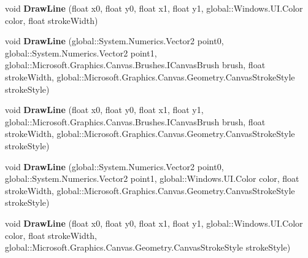 \begin{DoxyCompactItemize}
\item 
\mbox{\label{class_microsoft_1_1_graphics_1_1_canvas_1_1_canvas_drawing_session_aa5854dcca2a2abe77a62c9dc1191af23}} 
void {\bfseries Draw\+Line} (float x0, float y0, float x1, float y1, global\+::\+Windows.\+U\+I.\+Color color, float stroke\+Width)
\item 
\mbox{\label{class_microsoft_1_1_graphics_1_1_canvas_1_1_canvas_drawing_session_a5b2e900372135826791a9feb8c13550c}} 
void {\bfseries Draw\+Line} (global\+::\+System.\+Numerics.\+Vector2 point0, global\+::\+System.\+Numerics.\+Vector2 point1, global\+::\+Microsoft.\+Graphics.\+Canvas.\+Brushes.\+I\+Canvas\+Brush brush, float stroke\+Width, global\+::\+Microsoft.\+Graphics.\+Canvas.\+Geometry.\+Canvas\+Stroke\+Style stroke\+Style)
\item 
\mbox{\label{class_microsoft_1_1_graphics_1_1_canvas_1_1_canvas_drawing_session_ac8b1ed9fade2cb154279e7264346052f}} 
void {\bfseries Draw\+Line} (float x0, float y0, float x1, float y1, global\+::\+Microsoft.\+Graphics.\+Canvas.\+Brushes.\+I\+Canvas\+Brush brush, float stroke\+Width, global\+::\+Microsoft.\+Graphics.\+Canvas.\+Geometry.\+Canvas\+Stroke\+Style stroke\+Style)
\item 
\mbox{\label{class_microsoft_1_1_graphics_1_1_canvas_1_1_canvas_drawing_session_a06731477ea3d279eb0c5362a7fe5623c}} 
void {\bfseries Draw\+Line} (global\+::\+System.\+Numerics.\+Vector2 point0, global\+::\+System.\+Numerics.\+Vector2 point1, global\+::\+Windows.\+U\+I.\+Color color, float stroke\+Width, global\+::\+Microsoft.\+Graphics.\+Canvas.\+Geometry.\+Canvas\+Stroke\+Style stroke\+Style)
\item 
\mbox{\label{class_microsoft_1_1_graphics_1_1_canvas_1_1_canvas_drawing_session_a36162e4fcb252a50541a8a090f23bed6}} 
void {\bfseries Draw\+Line} (float x0, float y0, float x1, float y1, global\+::\+Windows.\+U\+I.\+Color color, float stroke\+Width, global\+::\+Microsoft.\+Graphics.\+Canvas.\+Geometry.\+Canvas\+Stroke\+Style stroke\+Style)

\end{DoxyCompactItemize}
